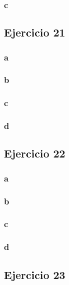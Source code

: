 \documentclass{article}
\begin{document}
\subsubsection*{c}

\subsection*{Ejercicio 21}

\subsubsection*{a}

\subsubsection*{b}

\subsubsection*{c}

\subsubsection*{d}

\subsection*{Ejercicio 22}

\subsubsection*{a}

\subsubsection*{b}

\subsubsection*{c}

\subsubsection*{d}

\subsection*{Ejercicio 23}
\end{document}
